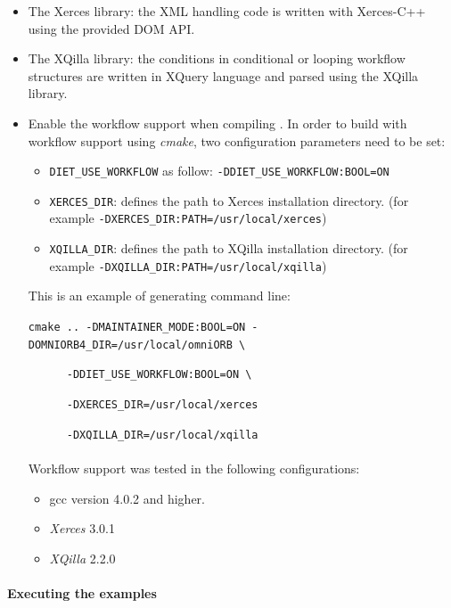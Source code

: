 \begin{itemize}
\item The Xerces library: the XML handling code is written with
  Xerces-C++ using the provided DOM API.
\item The XQilla library: the conditions in conditional or looping workflow
  structures are written in XQuery language and parsed using the XQilla library.
\item Enable the workflow support when compiling \diet. In order to build \diet
  with workflow support using \textit{cmake}, two configuration parameters need
 to be set:

\begin{itemize}
\item \texttt{DIET\_USE\_WORKFLOW} as follow: \texttt{-DDIET\_USE\_WORKFLOW:BOOL=ON}
\item \texttt{XERCES\_DIR}: defines the path to Xerces installation directory.
  (for example \texttt{-DXERCES\_DIR:PATH=/usr/local/xerces})
\item \texttt{XQILLA\_DIR}: defines the path to XQilla installation directory.
  (for example \texttt{-DXQILLA\_DIR:PATH=/usr/local/xqilla})
\end{itemize}

This is an example of generating command line:

\verb|cmake .. -DMAINTAINER_MODE:BOOL=ON -DOMNIORB4_DIR=/usr/local/omniORB \|

\verb|      -DDIET_USE_WORKFLOW:BOOL=ON \|

\verb|      -DXERCES_DIR=/usr/local/xerces|

\verb|      -DXQILLA_DIR=/usr/local/xqilla|

\paragraph{}
Workflow support was tested in the following configurations:

\begin{itemize}
\item gcc version 4.0.2 and higher.
\item \textit{Xerces} 3.0.1
\item \textit{XQilla} 2.2.0
\end{itemize}
\end{itemize}

\paragraph{Executing the examples}
\label{sec:wf_examples}

